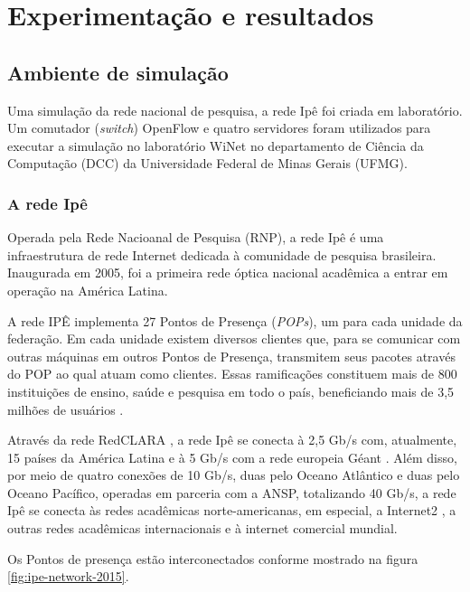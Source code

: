 \chapter{Experimentação e resultados}
\label{cap:experiments}

\section{Ambiente de simulação}

Uma simulação da rede nacional de pesquisa, a rede Ipê \citep{ipe2015network} 
foi criada em laboratório.
Um comutador (\emph{switch}) OpenFlow e quatro servidores foram utilizados 
para executar a simulação no laboratório WiNet \citep{winet22015lab}
no departamento de Ciência da Computação (DCC) da Universidade Federal 
de Minas Gerais (UFMG).

\subsection{A rede Ipê}
Operada pela Rede Nacioanal de Pesquisa (RNP), a rede Ipê é uma infraestrutura
de rede Internet dedicada à comunidade de pesquisa brasileira.
Inaugurada em 2005, foi a primeira rede óptica nacional acadêmica a entrar em
operação na América Latina.

A rede IPÊ implementa 27 Pontos de Presença (\emph{POPs}), um para cada unidade
da federação.
Em cada unidade existem diversos clientes que, para se comunicar com outras 
máquinas em outros Pontos de Presença, transmitem seus pacotes através do 
POP ao qual atuam como clientes.
Essas ramificações constituem mais de 800 instituições de ensino, saúde e 
pesquisa em todo o país, beneficiando mais de 3,5 milhões de usuários
\citep{ipe2015network}.

Através da rede RedCLARA \citep{redclara2015network}, a rede Ipê se conecta 
à 2,5 Gb/s com, atualmente, 15 países da América Latina e à 5 Gb/s com a rede
europeia Géant \citep{geant2015network}. 
Além disso, por meio de quatro conexões de
10 Gb/s, duas pelo Oceano Atlântico e duas pelo Oceano Pacífico, 
operadas em parceria com a ANSP, totalizando 40 Gb/s, a rede Ipê se conecta 
às redes acadêmicas norte-americanas, em especial, a  Internet2 
\citep{internet22015network}, a outras redes acadêmicas internacionais e à 
internet comercial mundial.

Os Pontos de presença estão interconectados conforme mostrado na figura 
\ref{fig:ipe-network-2015}.


